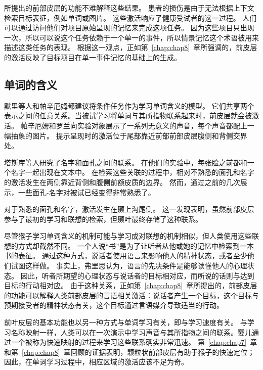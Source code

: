 所提出的前部皮层的功能不难解释这些结果。
患者的损伤是由于无法根据上下文检索目标表征，例如单词或图片。
这些激活响应了健康受试者的这一过程。
人们可以通过访问他们对项目原始呈现的记忆来完成这项任务。
因为这些项目只出现一次，所以可以说这个任务依赖于一个单一的事件，所以情景记忆这个术语被用来描述这类任务的表现\cite{fletcher2001frontal}。
根据这一观点，正如第~\ref{chap:chap8}~章所强调的，前皮层的激活反映了目标项目在单一事件记忆的基础上的生成。
\par



\subsection{单词的含义}

默里等人\cite{murray2002arbitrary}和帕辛厄姆\cite{passingham2008special}都建议将条件任务作为学习单词含义的模型。
它们共享两个表示之间的任意关系。当被试学习将单词与其所指物联系起来时，前皮层就会被激活。
帕辛厄姆和罗兰\cite{klingberg1998right}向实验对象展示了一系列无意义的声音，每个声音都配上一幅抽象的图片。
提示呈现时的激活位于尾部靠近前部前部皮层腹侧和背侧交界处。
\par


塔斯库等人\cite{tsukiura2002neural}研究了名字和面孔之间的联系。
在他们的实验中，每张脸之前都和一个名字一起出现在文本中。
在检索这些关联的过程中，相对不熟悉的面孔和名字的激活发生在两侧靠近背侧和腹侧前额皮质的边界。
然而，通过之前的几次展示，一些面孔-名字对被试已经变得非常熟悉了。
\par


对于熟悉的面孔和名字，激活发生在颞上沟尾侧。
这一发现表明，虽然前部皮层参与了最初的学习和联想的检索，但颞叶最终存储了这种联系。
\par

尽管猴子学习单词含义的机制可能与学习成对联想的机制相似，但人类使用这些联想的方式却截然不同。
一个人说“书”是为了让听者从他或她的记忆中检索到一本书的表征。
通过这种方式，说话者使用语言来影响他人的精神状态，或者至少他们试图这样做。
事实上，弗里思\cite{frith2007making}认为，语言的先决条件是能够读懂他人的心理状态。
因此，听者所期望的心理状态与说话者的目标相对应，而所说的话则与达到目标的行动相对应。
由于这种关系，正如第~\ref{chap:chap8}~章所提出的，前部皮层的功能可以解释人类前部皮层的言语相关激活：说话者产生一个目标，这个目标与预期接受者的精神状态有关，这个目标通过言语媒介导致适当的行动。
\par


前叶皮层的基本功能也以另一种方式与单词学习有关，即与学习速度有关。
与学习名称映射一样，人类可以在一次演示中学习声音与其所指物之间的联系。婴儿通过一个被称为快速映射的过程来学习这些联系确实非常迅速\cite{bloom2002children}。
第~\ref{chap:chap7}~章和第~\ref{chap:chap8}~章回顾的证据表明，颗粒状前部皮层有助于猴子的快速定位；
因此，在单词学习过程中，相应区域的激活应该不足为奇。



